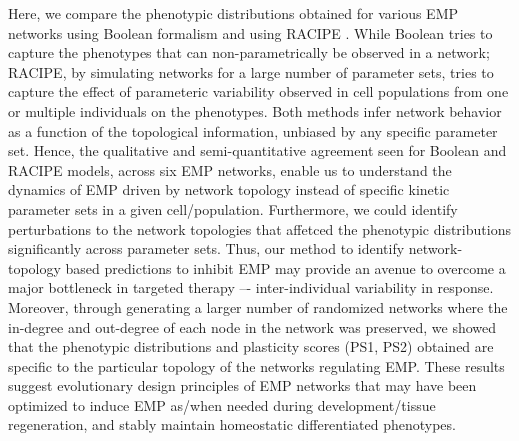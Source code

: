 \documentclass[preprint,review,12pt]{elsarticle}
\begin{document}
	Here, we compare the phenotypic distributions obtained for various EMP networks using Boolean formalism \cite{Font-Clos2018} and using RACIPE \cite{Huang2016}. While Boolean tries to capture the phenotypes that can non-parametrically be observed in a network; RACIPE, by simulating networks for a large number of parameter sets, tries to capture the effect of parameteric variability observed in cell populations from one or multiple individuals on the phenotypes. \color{red}Both methods infer network behavior as a function of the topological information, unbiased by any specific parameter set. \color{black}Hence, the qualitative and semi-quantitative agreement seen for Boolean and RACIPE models, across six EMP networks, enable us to understand the dynamics of EMP driven by network topology instead of specific kinetic parameter sets in a given cell/population. Furthermore, we could identify perturbations to the network topologies that affetced the phenotypic distributions significantly across parameter sets. Thus, our method to identify network-topology based predictions to inhibit EMP may provide an avenue to overcome a major bottleneck in targeted therapy –- inter-individual variability in response. Moreover, through generating a larger number of randomized networks where the in-degree and out-degree of each node in the network was preserved, we showed that the phenotypic distributions and plasticity scores (PS1, PS2) obtained are specific to the particular topology of the networks regulating EMP. These results suggest evolutionary design principles of EMP networks that may have been optimized to induce EMP as/when needed during development/tissue regeneration, and stably maintain homeostatic differentiated phenotypes.
	
\end{document}
